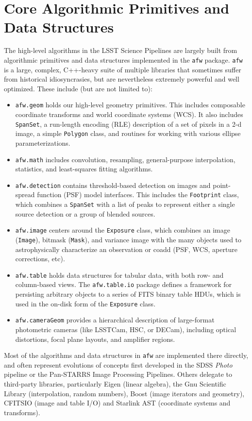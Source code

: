 \section{Core Algorithmic Primitives and Data Structures}
\label{sec:core}

The high-level algorithms in the LSST Science Pipelines are largely built from algorithmic primitives and data structures implemented in the \texttt{afw} package.
\texttt{afw} is a large, complex, C++-heavy suite of multiple libraries that sometimes suffer from historical idiosyncrasies, but are nevertheless extremely powerful and well optimized.
These include (but are not limited to):
\begin{itemize}
\item \texttt{afw.geom} holds our high-level geometry primitives.  This includes composable coordinate transforms and world coordinate systems (WCS).
    It also includes \texttt{SpanSet}, a run-length encoding (RLE) description of a set of pixels in a 2-d image, a simple \texttt{Polygon} class, and routines for working with various ellipse parameterizations.
\item \texttt{afw.math} includes convolution, resampling, general-purpose interpolation, statistics, and least-squares fitting algorithms.
\item \texttt{afw.detection} contains threshold-based detection on images and point-spread function (PSF) model interfaces.
    This includes the \texttt{Footprint} class, which combines a \texttt{SpanSet} with a list of peaks to represent either a single source detection or a group of blended sources.
\item \texttt{afw.image} centers around the \texttt{Exposure} class, which combines an image (\texttt{Image}), bitmask (\texttt{Mask}), and variance image with the many objects used to astrophysically characterize an observation or coadd (PSF, WCS, aperture corrections, etc).
\item \texttt{afw.table} holds data structures for tabular data, with both row- and column-based views.  The \texttt{afw.table.io} package defines a framework for persisting arbitrary objects to a series of FITS binary table HDUs, which is used in the on-disk form of the \texttt{Exposure} class.
\item \texttt{afw.cameraGeom} provides a hierarchical description of large-format photometric cameras (like LSSTCam, HSC, or DECam), including optical distortions, focal plane layouts, and amplifier regions.
\end{itemize}
Most of the algorithms and data structures in \texttt{afw} are implemented there directly, and often represent evolutions of concepts first developed in the SDSS \emph{Photo} pipeline or the Pan-STARRS Image Processing Pipelines.
Others delegate to third-party libraries, particularly Eigen (linear algebra), the Gnu Scientific Library (interpolation, random numbers), Boost (image iterators and geometry), CFITSIO (image and table I/O) and Starlink AST (coordinate systems and transforms).

